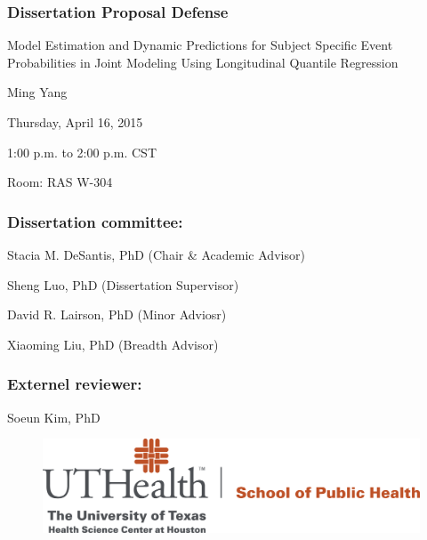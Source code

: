 \documentclass[10pt,a4paper,showtrims]{memoir}
\begin{document}
\subsubsection*{\Large Dissertation Proposal Defense}\vspace{2em}
\pagestyle{empty}
\begin{center}
\Huge{Model Estimation and Dynamic Predictions for Subject Specific Event Probabilities in Joint Modeling Using Longitudinal Quantile Regression}
\end{center}

\vspace{5em}

\begin{center}
\Large{Ming Yang}\vspace{2em}

\Large{Thursday, April 16, 2015}\par\vspace{0.5em}
\Large{1:00 p.m. to 2:00 p.m. CST}\par\vspace{0.5em}
\Large{Room: RAS W-304}
\end{center}

\vspace{5em}
\subsubsection*{\Large Dissertation committee:}
\Large{Stacia M. DeSantis, PhD (Chair \& Academic Advisor)}\par\vspace{0.5em}
\Large{Sheng Luo, PhD (Dissertation Supervisor)}\par\vspace{0.5em}
\Large{David R. Lairson, PhD (Minor Adviosr)}\par\vspace{0.5em}
\Large{Xiaoming Liu, PhD (Breadth Advisor)}\\

\vspace{1em}
\subsubsection*{\Large Externel reviewer:}
\Large{Soeun Kim, PhD}

\vspace{3em}
\begin{figure}[H]
\begin{center}
\includegraphics[scale=0.25]{SPHlogo.png}
\end{center}
\end{figure}
\end{document}
